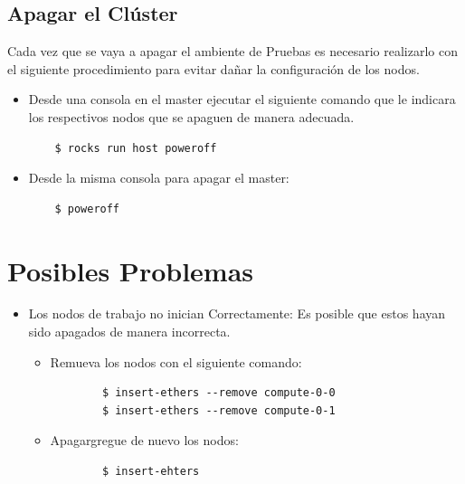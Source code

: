 \subsection{Apagar el Clúster}

Cada vez que se vaya a apagar el ambiente de Pruebas es necesario realizarlo con el siguiente procedimiento para evitar dañar la configuración de los nodos. 

\begin{itemize}
	\item Desde una consola en el master ejecutar el siguiente comando que le indicara los respectivos nodos que se apaguen de manera adecuada. 

	 \begin{verbatim}
	$ rocks run host poweroff
 	\end{verbatim}

 	\item Desde la misma consola para apagar el master: 

 	\begin{verbatim}
 	$ poweroff
 	\end{verbatim}
 	
  
\end{itemize}



\section{Posibles Problemas}

\begin{itemize}

	\item Los nodos de trabajo no inician Correctamente: Es posible que estos hayan sido apagados de manera incorrecta. 

	\begin{itemize}
		\item Remueva los nodos con el siguiente comando: 


		\begin{verbatim}
		$ insert-ethers --remove compute-0-0
		$ insert-ethers --remove compute-0-1
		\end{verbatim}

		\item Apagargregue de nuevo los nodos: 


		\begin{verbatim}
		$ insert-ehters
		\end{verbatim}
		
		
	\end{itemize}


\end{itemize}




